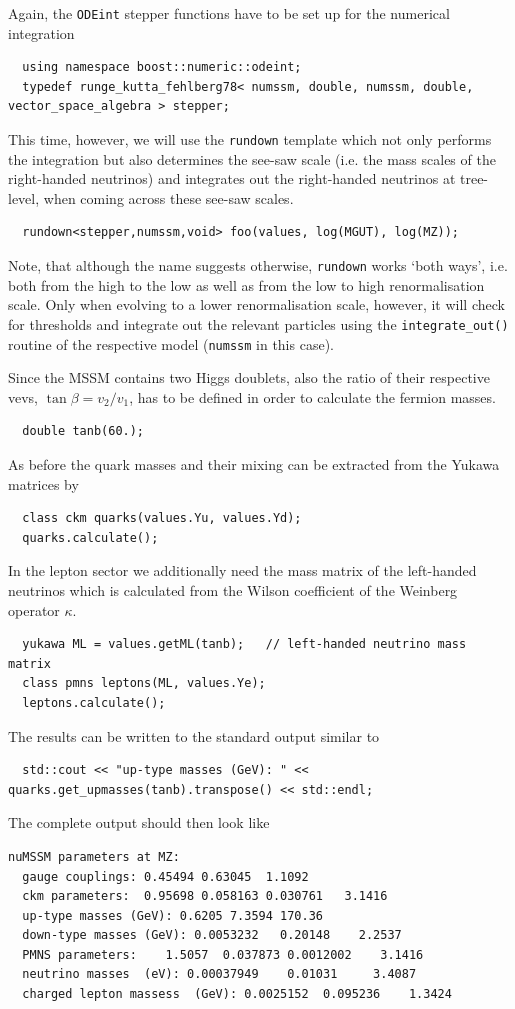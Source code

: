 \documentclass[11pt,a4paper]{article}
\begin{document}
Again, the \texttt{ODEint} stepper functions have to be set up for the numerical integration
\begin{lstlisting}
  using namespace boost::numeric::odeint;
  typedef runge_kutta_fehlberg78< numssm, double, numssm, double, vector_space_algebra > stepper;
\end{lstlisting}
This time, however, we will use the \texttt{rundown} template which not only performs the integration but also determines the see-saw scale (i.e. the mass scales of the right-handed neutrinos) and integrates out the right-handed neutrinos at tree-level, when coming across these see-saw scales.
\begin{lstlisting}
  rundown<stepper,numssm,void> foo(values, log(MGUT), log(MZ));
\end{lstlisting}
Note, that although the name suggests otherwise, \texttt{rundown} works `both ways', i.e. both from the high to the low as well as from the low to high renormalisation scale. Only when evolving to a lower renormalisation scale, however, it will check for thresholds and integrate out the relevant particles using the \texttt{integrate\_out()} routine of the respective model (\texttt{numssm} in this case).
  
Since the MSSM contains two Higgs doublets, also the ratio of their respective vevs, $\tan\beta = v_2 / v_1$, has to be defined in order to calculate the fermion masses.
\begin{lstlisting}
  double tanb(60.);
\end{lstlisting}
As before the quark masses and their mixing can be extracted from the Yukawa matrices by
\begin{lstlisting}
  class ckm quarks(values.Yu, values.Yd);
  quarks.calculate();
\end{lstlisting}
In the lepton sector we additionally need the mass matrix of the left-handed neutrinos which is calculated from the Wilson coefficient of the Weinberg operator $\kappa$.
\begin{lstlisting}
  yukawa ML = values.getML(tanb);   // left-handed neutrino mass matrix
  class pmns leptons(ML, values.Ye);
  leptons.calculate();
\end{lstlisting}
The results can be written to the standard output similar to
\begin{lstlisting}
  std::cout << "up-type masses (GeV): " << quarks.get_upmasses(tanb).transpose() << std::endl;
\end{lstlisting}    
The complete output should then look like
\begin{lstlisting}[keywordstyle=\color{blue}]
  nuMSSM parameters at MZ:
  gauge couplings: 0.45494 0.63045  1.1092
  ckm parameters:  0.95698 0.058163 0.030761   3.1416
  up-type masses (GeV): 0.6205 7.3594 170.36
  down-type masses (GeV): 0.0053232   0.20148    2.2537
  PMNS parameters:    1.5057  0.037873 0.0012002    3.1416
  neutrino masses  (eV): 0.00037949    0.01031     3.4087
  charged lepton massess  (GeV): 0.0025152  0.095236    1.3424
\end{lstlisting}    
\end{document}
